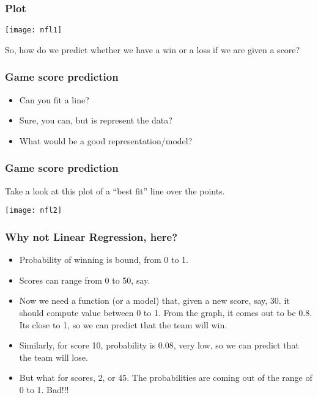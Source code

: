 \begin{frame}[fragile]\frametitle{Plot}
\begin{center}
\texttt{[image: nfl1]}
\end{center}
So, how do we predict whether we have a win or a loss if we are given a score?
\end{frame}



\begin{frame}[fragile]\frametitle{Game score prediction}
\begin{itemize}
\item Can you fit a line?
\item Sure, you can, but is represent the data?
\item What would be a good representation/model?
\end{itemize}
\end{frame}

\begin{frame}[fragile]\frametitle{Game score prediction}
Take a look at this plot of a ``best fit'' line over the points.
\begin{center}
\texttt{[image: nfl2]}
\end{center}

\end{frame}

\begin{frame}[fragile]\frametitle{Why not Linear Regression, here?}
\begin{itemize}
\item Probability of winning is bound, from 0 to 1.
\item Scores can range from 0 to 50, say.
\item Now we need a function (or a model) that, given a new score, say, 30. it should compute value between 0 to 1. From the graph, it comes out to be 0.8. Its close to 1, so we can predict that the team will win.
\item Similarly, for score 10, probability is 0.08, very low, so we can predict that the team will lose.
\item But what for scores, 2, or 45. The probabilities are coming out of the range of 0 to 1. Bad!!!
\end{itemize}

\end{frame}

